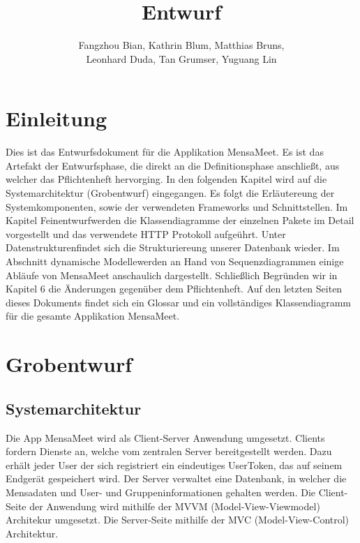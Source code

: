 \documentclass[a4paper]{scrreprt}
\begin{document}
\title{Entwurf}
\author{Fangzhou Bian, Kathrin Blum, Matthias Bruns, \\Leonhard Duda, Tan Grumser, Yuguang Lin}
\maketitle
\tableofcontents



\chapter{Einleitung}

Dies ist das Entwurfsdokument für die Applikation \dq MensaMeet\dq.  Es ist das Artefakt der Entwurfsphase, die direkt an die Definitionsphase anschließt, aus welcher das Pflichtenheft hervorging.
In den folgenden Kapitel wird auf die Systemarchitektur (\dq Grobentwurf\dq) eingegangen. Es folgt die Erläutereung der Systemkomponenten, sowie der verwendeten Frameworks und Schnittstellen. Im Kapitel \dq Feinentwurf\dq werden die Klassendiagramme der einzelnen Pakete im Detail vorgestellt und das verwendete HTTP Protokoll aufgeührt. Unter \dq Datenstrukturen\dq findet sich die Strukturiereung unserer Datenbank wieder. 
Im Abschnitt \dq dynamische Modelle\dq werden an Hand von Sequenzdiagrammen einige Abläufe von MensaMeet anschaulich dargestellt.
Schließlich Begründen wir in Kapitel 6 die Änderungen gegenüber dem Pflichtenheft.
Auf den letzten Seiten dieses Dokuments findet sich ein Glossar und ein vollständiges Klassendiagramm für die gesamte Applikation MensaMeet.




\chapter{Grobentwurf}
\section{Systemarchitektur}
Die App MensaMeet wird als Client-Server Anwendung umgesetzt. Clients fordern Dienste an, welche vom zentralen Server bereitgestellt werden. Dazu erhält jeder User der sich registriert ein eindeutiges UserToken, das auf seinem Endgerät gespeichert wird. Der Server verwaltet eine Datenbank, in welcher die Mensadaten und User- und Gruppeninformationen gehalten werden. 
Die Client-Seite der Anwendung wird mithilfe der MVVM (Model-View-Viewmodel) Architekur umgesetzt.
Die Server-Seite mithilfe der MVC (Model-View-Control) Architektur.
\end{document}
